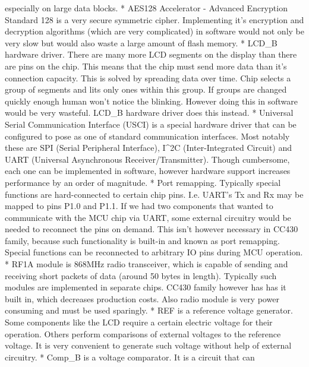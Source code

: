 \begin{commnet}
       especially on large data blocks.
     * AES128 Accelerator - Advanced Encryption Standard 128 is a very
       secure symmetric cipher. Implementing it's encryption and
       decryption algorithms (which are very complicated) in software
       would not only be very slow but would also waste a large
       amount of flash memory.
     * LCD_B hardware driver. There are many more LCD segments on the
       display than there are pins on the chip. This means that the
       chip must send more data than it's connection capacity. This is
       solved by spreading data over time. Chip selects a group of
       segments and lits only ones within this group. If groups are
       changed quickly enough human won't notice the blinking. However
       doing this in software would be very wasteful. LCD_B hardware
       driver does this instead.
     * Universal Serial Communication Interface (USCI) is a special
       hardware driver that can be configured to pose as one of
       standard communication interfaces. Most notably these are SPI
       (Serial Peripheral Interface), I^2C (Inter-Integrated Circuit)
       and UART (Universal Asynchronous Receiver/Transmitter). Though
       cumbersome, each one can be implemented in software, however
       hardware support increases performance by an order of
       magnitude.
     * Port remapping. Typically special functions are hard-connected to
       certain chip pins. I.e. UART's Tx and Rx may be mapped to pins
       P1.0 and P1.1. If we had two components that wanted to
       communicate with the MCU chip via UART, some external circuitry
       would be needed to reconnect the pins on demand. This isn't
       however necessary in CC430 family, because such functionality is
       built-in and known as port remapping. Special functions can
       be reconnected to arbitrary IO pins during MCU operation.
     * RF1A module is 868MHz radio transceiver, which is capable of
     sending and receiving short packets of data (around 50 bytes in
     length). Typically such modules are implemented in separate
     chips. CC430 family however has has it built in, which decreases
     production costs. Also radio module is very power consuming and
     must be used sparingly.
     * REF is a reference voltage generator. Some components like the
     LCD require a certain electric voltage for their operation.
     Others perform comparisons of external voltages to the reference
     voltage. It is very convenient to generate such voltage without
     help of external circuitry.
     * Comp_B is a voltage comparator. It is a circuit that can

\end{commnet}

